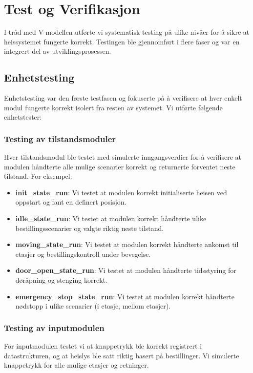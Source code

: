 \chapter{Test og Verifikasjon}
I tråd med V-modellen utførte vi systematisk testing på ulike nivåer for å sikre at heissystemet fungerte korrekt. Testingen ble gjennomført i flere faser og var en integrert del av utviklingsprosessen.

\section{Enhetstesting}
Enhetstesting var den første testfasen og fokuserte på å verifisere at hver enkelt modul fungerte korrekt isolert fra resten av systemet. Vi utførte følgende enhetstester:

\subsection{Testing av tilstandsmoduler}
Hver tilstandsmodul ble testet med simulerte inngangsverdier for å verifisere at modulen håndterte alle mulige scenarier korrekt og returnerte forventet neste tilstand. For eksempel:

\begin{itemize}
    \item \textbf{init\_state\_run}: Vi testet at modulen korrekt initialiserte heisen ved oppstart og fant en definert posisjon.
    \item \textbf{idle\_state\_run}: Vi testet at modulen korrekt håndterte ulike bestillingsscenarier og valgte riktig neste tilstand.
    \item \textbf{moving\_state\_run}: Vi testet at modulen korrekt håndterte ankomst til etasjer og bestillingskontroll under bevegelse.
    \item \textbf{door\_open\_state\_run}: Vi testet at modulen håndterte tidsstyring for døråpning og stenging korrekt.
    \item \textbf{emergency\_stop\_state\_run}: Vi testet at modulen korrekt håndterte nødstopp i ulike scenarier (i etasje, mellom etasjer).
\end{itemize}

\subsection{Testing av inputmodulen}
For inputmodulen testet vi at knappetrykk ble korrekt registrert i datastrukturen, og at heislys ble satt riktig basert på bestillinger. Vi simulerte knappetrykk for alle mulige etasjer og retninger.

